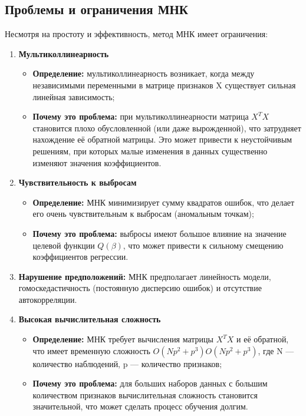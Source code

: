 \subsection{Проблемы и ограничения МНК}

Несмотря на простоту и эффективность, метод МНК имеет ограничения:  

\begin{enumerate}

    \item \textbf{Мультиколлинеарность}
		\begin{itemize}
			\item \textbf{Определение:} мультиколлинеарность возникает, когда между независимыми переменными в матрице признаков X существует сильная линейная зависимость;
			\item \textbf{Почему это проблема:} при мультиколлинеарности матрица \(X^T X\) становится плохо обусловленной (или даже вырожденной), что затрудняет нахождение её обратной матрицы. Это может привести к неустойчивым решениям, при которых малые изменения в данных существенно изменяют значения коэффициентов.
		\end{itemize}

	\item \textbf{Чувствительность к выбросам}
		\begin{itemize}
			\item \textbf{Определение:} МНК минимизирует сумму квадратов ошибок, что делает его очень чувствительным к выбросам (аномальным точкам);
			\item \textbf{Почему это проблема:} выбросы имеют большое влияние на значение целевой функции \(Q(\beta)\), что может привести к сильному смещению коэффициентов регрессии.
		\end{itemize}

	\item \textbf{Нарушение предположений:} МНК предполагает линейность модели, гомоскедастичность (постоянную дисперсию ошибок) и отсутствие автокорреляции.
	
	\item \textbf{Высокая вычислительная сложность}
		\begin{itemize}
			\item \textbf{Определение:} МНК требует вычисления матрицы \(X^T X\) и её обратной, что имеет временную сложность \(O(Np^2+p^3)O(Np^2+p^3)\), где N — количество наблюдений, p — количество признаков;
			\item \textbf{Почему это проблема:} для больших наборов данных с большим количеством признаков вычислительная сложность становится значительной, что может сделать процесс обучения долгим.
		\end{itemize}
		
\end{enumerate}

